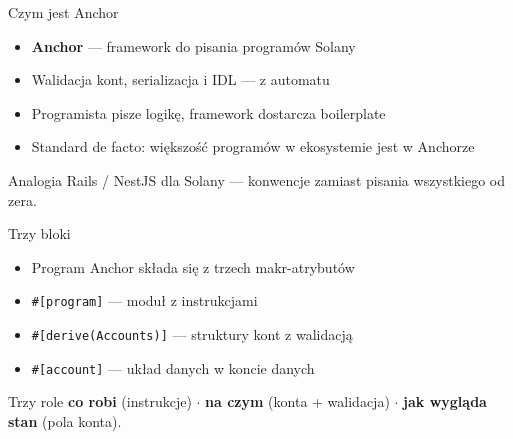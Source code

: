\begin{frame}{Czym jest Anchor}
  \begin{itemize}
    \item \textbf{Anchor} --- framework do pisania programów Solany
    \item Walidacja kont, serializacja i IDL --- z automatu
    \item Programista pisze logikę, framework dostarcza boilerplate
    \item Standard de facto: większość programów w ekosystemie jest w Anchorze
  \end{itemize}
  \vspace{0.25cm}
  \begin{exampleblock}{Analogia}
    Rails / NestJS dla Solany --- konwencje zamiast pisania wszystkiego od zera.
  \end{exampleblock}
\end{frame}

\begin{frame}{Trzy bloki}
  \begin{itemize}
    \item Program Anchor składa się z trzech makr-atrybutów
    \item \texttt{\#[program]} --- moduł z instrukcjami
    \item \texttt{\#[derive(Accounts)]} --- struktury kont z walidacją
    \item \texttt{\#[account]} --- układ danych w koncie danych
  \end{itemize}
  \vspace{0.25cm}
  \begin{block}{Trzy role}
    \textbf{co robi} (instrukcje) $\cdot$ \textbf{na czym} (konta + walidacja) $\cdot$
    \textbf{jak wygląda stan} (pola konta).
  \end{block}
\end{frame}

